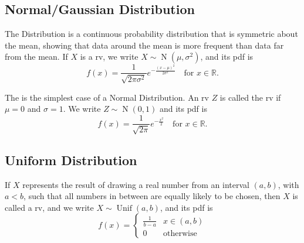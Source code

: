 \documentclass[notoc,notitlepage]{tufte-book}
\DeclareMathOperator{\Unif}{Unif }
\DeclareMathOperator{\Nor}{N }
\begin{document}
\subsection{Normal/Gaussian Distribution}
\label{sub:normal_gaussian_distribution}

\begin{defn}\label{defn:normal_gaussian_rv}
  The  Distribution is a continuous probability distribution that is symmetric about the mean, showing that data around the mean is more frequent than data far from the mean. If $X$ is a  rv, we write $X \sim \Nor(\mu, \sigma^2)$, and its pdf is
  \begin{equation*}
    f(x) = \frac{1}{\sqrt{2 \pi \sigma^2}} e^{- \frac{(x - \mu)^2}{2 \sigma^2}} \quad \text{for } x \in \mathbb{R}.
  \end{equation*}
\end{defn}

\begin{defn}\label{defn:standard_normal_distribution}
  The  is the simplest case of a Normal Distribution. An rv $Z$ is called the  rv if $\mu = 0$ and $\sigma = 1$. We write $Z \sim \Nor(0, 1)$ and its pdf is
  \begin{equation*}
    f(x) = \frac{1}{\sqrt{2 \pi}} e^{- \frac{x^2}{2}} \quad \text{for } x \in \mathbb{R}.
  \end{equation*}
\end{defn}


\subsection{Uniform Distribution}
\label{sub:uniform_distribution}

\begin{defn}[Uniform RV]\label{defn:uniform_rv}
  If $X$ represents the result of drawing a real number from an interval $(a, b)$, with $a < b$, such that all numbers in between are equally likely to be chosen, then $X$ is called a  rv, and we write $X \sim \Unif(a, b)$, and its pdf is
  \begin{equation*}
    f(x) = \begin{cases} 
      \frac{1}{b - a} & x \in (a, b) \\
      0               & \text{otherwise}
    \end{cases}
  \end{equation*}
\end{defn}
\end{document}
